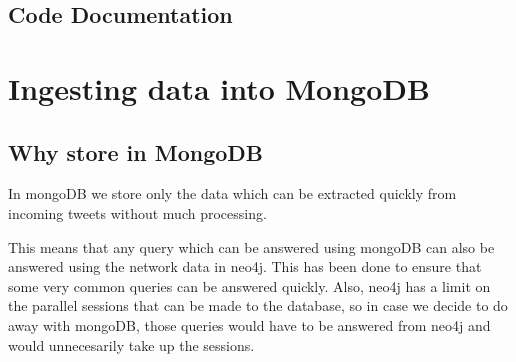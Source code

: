 \documentclass[letterpaper,10pt,english]{sphinxmanual}
\begin{document}
\section{Code Documentation}
\label{\detokenize{neo4j_data_ingestion:code-documentation}}

\chapter{Ingesting data into MongoDB}
\label{\detokenize{mongoDB_data_ingestion:ingesting-data-into-mongodb}}\label{\detokenize{mongoDB_data_ingestion::doc}}

\section{Why store in MongoDB}
\label{\detokenize{mongoDB_data_ingestion:why-store-in-mongodb}}
In mongoDB we store only the data which can be extracted quickly from incoming tweets without much processing.

This means that any query which can be answered using mongoDB can also be answered using the network data in neo4j. This has been done to ensure that some very common queries can be answered quickly. Also, neo4j has a limit on the parallel sessions that can be made to the database, so in case we decide to do away with mongoDB, those queries would have to be answered from neo4j and would unnecesarily take up the sessions.
\end{document}
